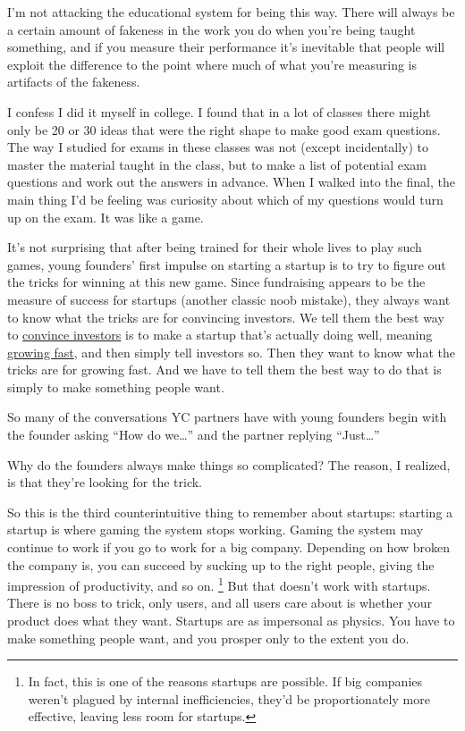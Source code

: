 \documentclass[12pt]{book}
\begin{document}
I'm not attacking the educational system for being this way. There will
always be a certain amount of fakeness in the work you do when you're
being taught something, and if you measure their performance it's
inevitable that people will exploit the difference to the point where
much of what you're measuring is artifacts of the fakeness.

I confess I did it myself in college. I found that in a lot of classes
there might only be 20 or 30 ideas that were the right shape to make
good exam questions. The way I studied for exams in these classes was
not (except incidentally) to master the material taught in the class,
but to make a list of potential exam questions and work out the answers
in advance. When I walked into the final, the main thing I'd be feeling
was curiosity about which of my questions would turn up on the exam. It
was like a game.

It's not surprising that after being trained for their whole lives to
play such games, young founders' first impulse on starting a startup is
to try to figure out the tricks for winning at this new game. Since
fundraising appears to be the measure of success for startups (another
classic noob mistake), they always want to know what the tricks are for
convincing investors. We tell them the best way to
\href{convince.html}{convince investors} is to make a startup that's
actually doing well, meaning \href{growth.html}{growing fast}, and then
simply tell investors so. Then they want to know what the tricks are for
growing fast. And we have to tell them the best way to do that is simply
to make something people want.

So many of the conversations YC partners have with young founders begin
with the founder asking ``How do we\ldots{}'' and the partner replying
``Just\ldots{}''

Why do the founders always make things so complicated? The reason, I
realized, is that they're looking for the trick.

So this is the third counterintuitive thing to remember about startups:
starting a startup is where gaming the system stops working. Gaming the
system may continue to work if you go to work for a big company.
Depending on how broken the company is, you can succeed by sucking up to
the right people, giving the impression of productivity, and so on.
\footnote{In fact, this is one of the reasons startups are possible. If
big companies weren't plagued by internal inefficiencies, they'd be
proportionately more effective, leaving less room for startups.} But that doesn't work with startups. There is no
boss to trick, only users, and all users care about is whether your
product does what they want. Startups are as impersonal as physics. You
have to make something people want, and you prosper only to the extent
you do.
\end{document}
